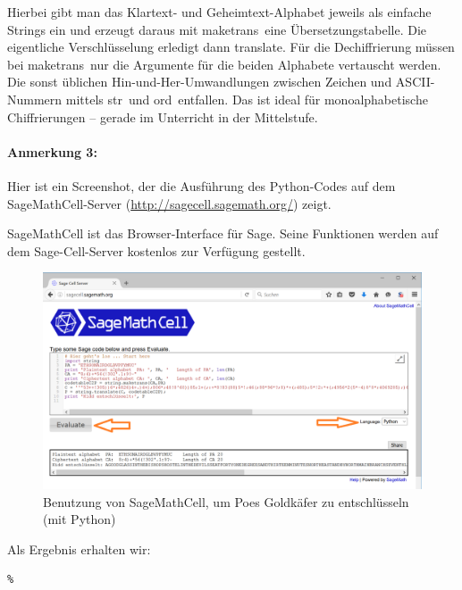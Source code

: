 \begin{refsegment}
Hierbei gibt man das Klartext- und Geheimtext-Alphabet jeweils als einfache Strings
ein und erzeugt daraus mit \glqq maketrans\grqq~eine Übersetzungstabelle. Die
eigentliche Verschlüsselung erledigt dann \glqq translate\grqq. Für die Dechiffrierung
müssen bei \glqq maketrans\grqq~nur die Argumente für die beiden Alphabete
vertauscht werden. Die sonst üblichen Hin-und-Her-Umwandlungen zwischen Zeichen und
ASCII-Nummern mittels \glqq str\grqq~und \glqq ord\grqq~entfallen.
Das ist ideal für monoalphabetische Chiffrierungen -- gerade im Unterricht in der Mittelstufe.


\paragraph*{Anmerkung 3:}
Hier ist ein Screenshot, der die Ausführung des Python-Codes auf dem SageMathCell-Server
(\url{http://sagecell.sagemath.org/}) zeigt.

SageMathCell ist das Browser-Interface für Sage. Seine Funktionen werden auf dem Sage-Cell-Server
kostenlos zur Verfügung gestellt.

\begin{figure}[ht]
\begin{center}
\includegraphics[scale=0.53]{../en/figures/Using-SageMathCell-with-Python-for-Poes-GoldBug}
\caption{Benutzung von SageMathCell, um Poes Goldkäfer zu entschlüsseln (mit Python)}
\label{MOV_Using-SageMathCell-with-Python-for-Poes-GoldBug}
\end{center}
\end{figure}


Als Ergebnis erhalten wir:

\begin{Verbatim}%


\end{Verbatim}
\end{refsegment}
